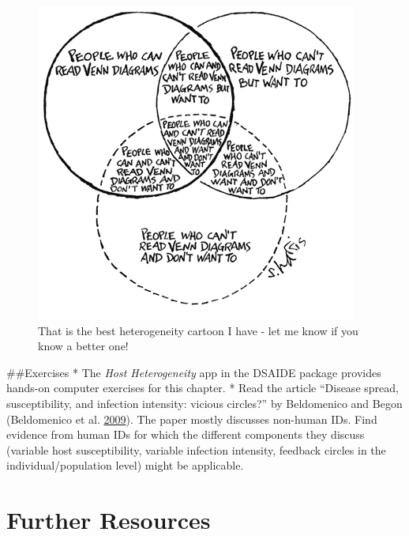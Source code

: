 \documentclass[]{book}
\theoremstyle{definition}
\theoremstyle{definition}
\theoremstyle{definition}
\theoremstyle{remark}
\begin{document}
\begin{figure}
\centering
\includegraphics{./images/crazyvenndiagram.png}
\caption{\label{fig:crazyvenndiagram}That is the best heterogeneity cartoon
I have - let me know if you know a better one!}
\end{figure}

\#\#Exercises * The \emph{Host Heterogeneity} app in the DSAIDE package
provides hands-on computer exercises for this chapter. * Read the
article ``Disease spread, susceptibility, and infection intensity:
vicious circles?'' by Beldomenico and Begon (Beldomenico et al.
\protect\hyperlink{ref-beldomenico09}{2009}). The paper mostly discusses
non-human IDs. Find evidence from human IDs for which the different
components they discuss (variable host susceptibility, variable
infection intensity, feedback circles in the individual/population
level) might be applicable.

\hypertarget{further-resources-4}{%
\section{Further Resources}\label{further-resources-4}}
\end{document}
